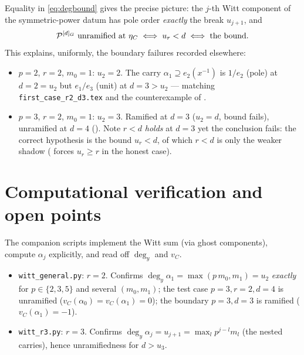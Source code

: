 \documentclass[11pt]{article}
\begin{document}
Equality in \cref{eq:degbound} gives the precise picture: the $j$-th Witt
component of the symmetric-power datum has pole order \emph{exactly} the break
$u_{j+1}$, and
\[
\mathcal{P}^{[d]_G}\ \text{unramified at }\eta_C \iff u_r<d \iff \text{the bound.}
\]
This explains, uniformly, the boundary failures recorded elsewhere:
\begin{itemize}
  \item $p=2$, $r=2$, $m_0=1$: $u_2=2$. The carry $\alpha_1\supseteq e_2(x^{-1})$
        is $1/e_2$ (pole) at $d=2=u_2$ but $e_1/e_3$ (unit) at $d=3>u_2$ ---
        matching \texttt{first\_case\_r2\_d3.tex} and the counterexample of
        .
  \item $p=3$, $r=2$, $m_0=1$: $u_2=3$. Ramified at $d=3$ ($u_2=d$, bound fails),
        unramified at $d=4$ (). Note $r<d$ \emph{holds} at
        $d=3$ yet the conclusion fails: the correct hypothesis is the bound
        $u_r<d$, of which $r<d$ is only the weaker shadow (
        forces $u_r\ge r$ in the honest case).
\end{itemize}

\section{Computational verification and open points}\label{sec:verify}

The companion scripts implement the Witt sum (via ghost components), compute
$\alpha_j$ explicitly, and read off $\deg_y$ and $v_C$.
\begin{itemize}
  \item \texttt{witt\_general.py}: $r=2$. Confirms $\deg_y\alpha_1=\max(p\,m_0,m_1)=u_2$
        \emph{exactly} for $p\in\{2,3,5\}$ and several $(m_0,m_1)$; the test case
        $p=3,r=2,d=4$ is unramified ($v_C(\alpha_0)=v_C(\alpha_1)=0$); the
        boundary $p=3,d=3$ is ramified ($v_C(\alpha_1)=-1$).
  \item \texttt{witt\_r3.py}: $r=3$. Confirms $\deg_y\alpha_j=u_{j+1}=\max_l p^{j-l}m_l$
        (the nested carries), hence unramifiedness for $d>u_3$.
\end{itemize}
\end{document}
